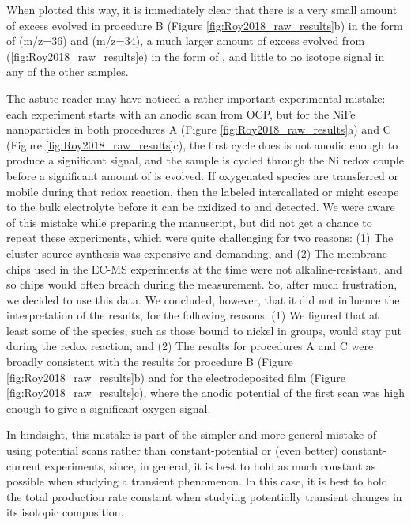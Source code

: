 When plotted this way, it is immediately clear that there is a very small amount of excess  evolved in procedure B (Figure \ref{fig:Roy2018_raw_results}b) in the form of  (m/z=36) and  (m/z=34), a much larger amount of excess  evolved from  (\ref{fig:Roy2018_raw_results}e) in the form of , and little to no isotope signal in any of the other samples.

The astute reader may have noticed a rather important experimental mistake: each experiment starts with an anodic scan from OCP, but for the NiFe nanoparticles in both procedures A (Figure \ref{fig:Roy2018_raw_results}a) and C (Figure \ref{fig:Roy2018_raw_results}c), the first cycle does is not anodic enough to produce a significant  signal, and the sample is cycled through the Ni redox couple before a significant amount of  is evolved. If oxygenated species are transferred or mobile during that redox reaction, then the labeled intercallated  or  might escape to the bulk electrolyte before it can be oxidized to  and detected. We were aware of this mistake while preparing the manuscript, but did not get a chance to repeat these experiments, which were quite challenging for two reasons: (1) The cluster source synthesis was expensive and demanding, and (2) The membrane chips used in the EC-MS experiments at the time were not alkaline-resistant, and so chips would often breach during the measurement. So, after much frustration, we decided to use this data. We concluded, however, that it did not influence the interpretation of the results, for the following reasons: (1) We figured that at least some of the  species, such as those bound to nickel in  groups, would stay put during the redox reaction, and (2) The results for procedures A and C were broadly consistent with the results for procedure B (Figure \ref{fig:Roy2018_raw_results}b) and for the electrodeposited film (Figure \ref{fig:Roy2018_raw_results}c), where the anodic potential of the first scan was high enough to give a significant oxygen signal. 

In hindsight, this mistake is part of the simpler and more general mistake of using potential scans rather than constant-potential or (even better) constant-current experiments, since, in general, it is best to hold as much constant as possible when studying a transient phenomenon. In this case, it is best to hold the total  production rate constant when studying potentially transient changes in its isotopic composition.

